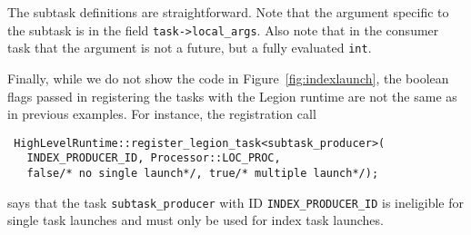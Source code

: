 The subtask definitions are straightforward.  Note that the argument specific to the subtask is
in the field {\tt task->local\_args}.  Also note that in the consumer task that 
the argument is not a future, but a fully evaluated {\tt int}.

Finally, while we do not show the code in Figure~\ref{fig:indexlaunch}, the boolean
flags passed in registering the tasks with the Legion runtime are not the same as in
previous examples.  For instance, the registration call
\begin{verbatim}
 HighLevelRuntime::register_legion_task<subtask_producer>(
   INDEX_PRODUCER_ID, Processor::LOC_PROC, 
   false/* no single launch*/, true/* multiple launch*/);
\end{verbatim}
says that the task {\tt subtask\_producer} with ID {\tt INDEX\_PRODUCER\_ID} is ineligible for
single task launches and must only be used for index task launches.


